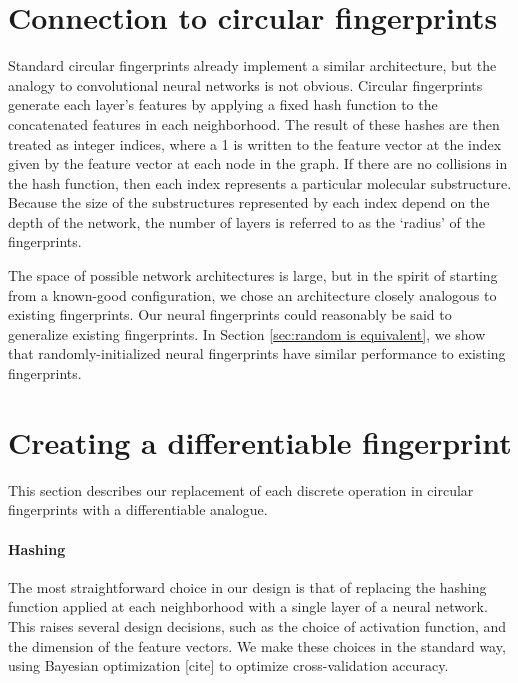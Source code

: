 \documentclass{article}
\begin{document}
\section{Connection to circular fingerprints}


Standard circular fingerprints already implement a similar architecture, but the analogy to convolutional neural networks is not obvious.
Circular fingerprints generate each layer's features by applying a fixed hash function to the concatenated features in each neighborhood.
The result of these hashes are then treated as integer indices, where a 1 is written to the feature vector at the index given by the feature vector at each node in the graph.
If there are no collisions in the hash function, then each index represents a particular molecular substructure.
Because the size of the substructures represented by each index depend on the depth of the network, the number of layers is referred to as the `radius' of the fingerprints.

The space of possible network architectures is large, but in the spirit of starting from a known-good configuration, we chose an architecture closely analogous to existing fingerprints.
Our neural fingerprints could reasonably be said to generalize existing fingerprints.
In Section \ref{sec:random is equivalent}, we show that randomly-initialized neural fingerprints have similar performance to existing fingerprints.

\section{Creating a differentiable fingerprint}
This section describes our replacement of each discrete operation in circular fingerprints with a differentiable analogue.

\paragraph{Hashing}
The most straightforward choice in our design is that of replacing the hashing function applied at each neighborhood with a single layer of a neural network.
This raises several design decisions, such as the choice of activation function, and the dimension of the feature vectors.
We make these choices in the standard way, using Bayesian optimization [cite] to optimize cross-validation accuracy.
\end{document}
